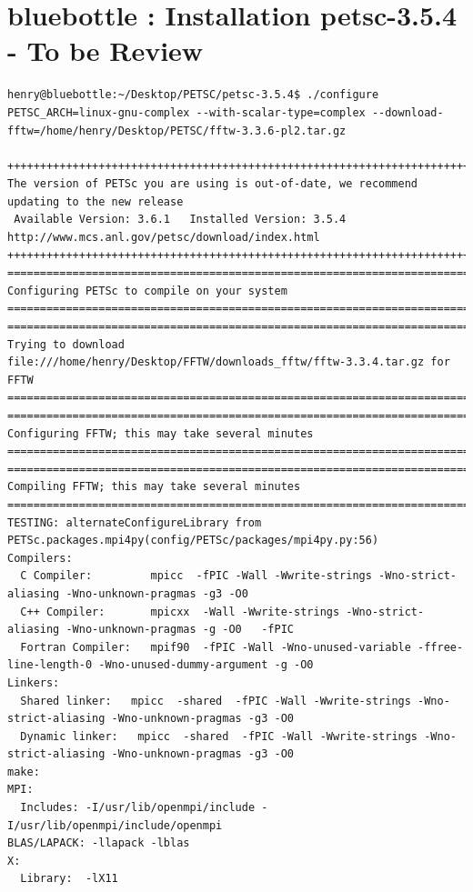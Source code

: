 \documentclass{article}
\begin{document}
\section{bluebottle : Installation petsc-3.5.4 - To be Review}
\tiny
\begin{verbatim}
henry@bluebottle:~/Desktop/PETSC/petsc-3.5.4$ ./configure PETSC_ARCH=linux-gnu-complex --with-scalar-type=complex --download-fftw=/home/henry/Desktop/PETSC/fftw-3.3.6-pl2.tar.gz 

+++++++++++++++++++++++++++++++++++++++++++++++++++++++++++++++++++++++++++++++++++++++++++
The version of PETSc you are using is out-of-date, we recommend updating to the new release
 Available Version: 3.6.1   Installed Version: 3.5.4
http://www.mcs.anl.gov/petsc/download/index.html
+++++++++++++++++++++++++++++++++++++++++++++++++++++++++++++++++++++++++++++++++++++++++++
===============================================================================
Configuring PETSc to compile on your system                       
===============================================================================
=============================================================================== 
Trying to download file:///home/henry/Desktop/FFTW/downloads_fftw/fftw-3.3.4.tar.gz for FFTW   
===============================================================================
===============================================================================
Configuring FFTW; this may take several minutes
===============================================================================
===============================================================================  
Compiling FFTW; this may take several minutes 
===============================================================================
TESTING: alternateConfigureLibrary from PETSc.packages.mpi4py(config/PETSc/packages/mpi4py.py:56) 
Compilers:
  C Compiler:         mpicc  -fPIC -Wall -Wwrite-strings -Wno-strict-aliasing -Wno-unknown-pragmas -g3 -O0 
  C++ Compiler:       mpicxx  -Wall -Wwrite-strings -Wno-strict-aliasing -Wno-unknown-pragmas -g -O0   -fPIC  
  Fortran Compiler:   mpif90  -fPIC -Wall -Wno-unused-variable -ffree-line-length-0 -Wno-unused-dummy-argument -g -O0  
Linkers:
  Shared linker:   mpicc  -shared  -fPIC -Wall -Wwrite-strings -Wno-strict-aliasing -Wno-unknown-pragmas -g3 -O0
  Dynamic linker:   mpicc  -shared  -fPIC -Wall -Wwrite-strings -Wno-strict-aliasing -Wno-unknown-pragmas -g3 -O0
make:
MPI:
  Includes: -I/usr/lib/openmpi/include -I/usr/lib/openmpi/include/openmpi
BLAS/LAPACK: -llapack -lblas
X:
  Library:  -lX11

\end{verbatim}
\end{document}
